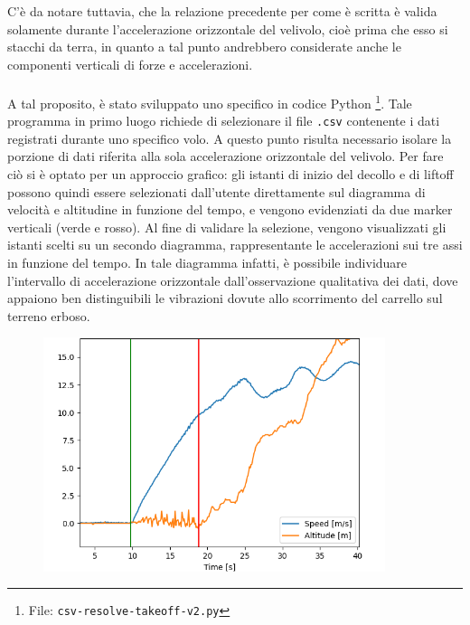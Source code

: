 \documentclass[12pt]{article}
\begin{document}
C'è da notare tuttavia, che la relazione precedente per come è scritta è valida solamente durante l'accelerazione orizzontale del velivolo, cioè prima che esso si stacchi da terra, in quanto a tal punto andrebbero considerate anche le componenti verticali di forze e accelerazioni.
\\\\
\noindent
A tal proposito, è stato sviluppato uno specifico in codice Python \footnote{File: \texttt{csv-resolve-takeoff-v2.py}}. Tale programma in primo luogo richiede di selezionare il file \texttt{.csv} contenente i dati registrati durante uno specifico volo. A questo punto risulta necessario isolare la porzione di dati riferita alla sola accelerazione orizzontale del velivolo. Per fare ciò si è optato per un approccio grafico: gli istanti di inizio del decollo e di liftoff possono quindi essere selezionati dall'utente direttamente sul diagramma di velocità e altitudine in funzione del tempo, e vengono evidenziati da due marker verticali (verde e rosso).
Al fine di validare la selezione, vengono visualizzati gli istanti scelti su un secondo diagramma, rappresentante le accelerazioni sui tre assi in funzione del tempo. In tale diagramma infatti, è possibile individuare l'intervallo di accelerazione orizzontale dall'osservazione qualitativa dei dati, dove appaiono ben distinguibili le vibrazioni dovute allo scorrimento del carrello sul terreno erboso.

\begin{figure}[H]
	\centering
	\includegraphics[width=10cm]{img/select-to-1}
\end{figure}

\vspace{-0.5cm}
\end{document}
